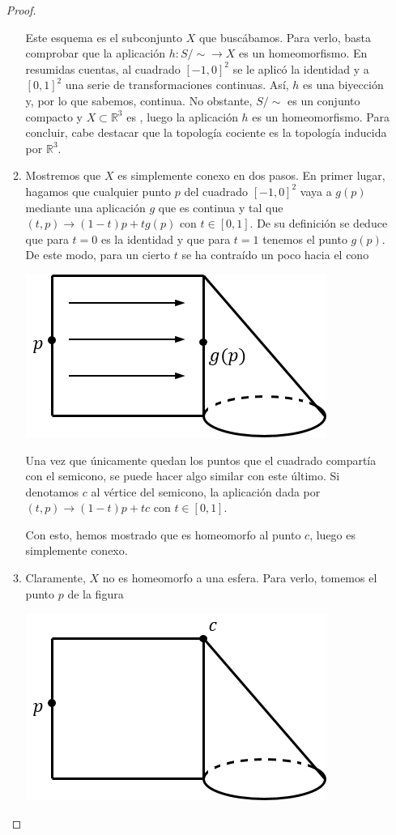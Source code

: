 \begin{itemize}
\begin{proof}
\begin{enumerate}
	Este esquema es el subconjunto $X$ que buscábamos. Para verlo, basta comprobar que la aplicación $h: S/\sim \to X$ es un homeomorfismo. En resumidas cuentas, al cuadrado $[-1,0]^2$ se le aplicó la identidad y a $[0,1]^2$ una serie de transformaciones continuas. Así, $h$ es una biyección y, por lo que sabemos, continua. No obstante, $S/\sim$ es un conjunto compacto y $X\subset \mathbb{R}^3$ es \hausdorff, luego la aplicación $h$ es un homeomorfismo. Para concluir, cabe destacar que la topología cociente es la topología inducida por $\mathbb{R}^3$.
	
	\item Mostremos que $X$ es simplemente conexo en dos pasos. En primer lugar, hagamos que cualquier punto $p$ del cuadrado $[-1,0]^2$ vaya a $g(p)$ mediante una aplicación $g$ que es continua y tal que $(t,p)\to (1-t)p+tg(p)$ con $t\in[0,1]$. De su definición se deduce que para $t=0$ es la identidad y que para $t=1$ tenemos el punto $g(p)$. De este modo, para un cierto $t$ se ha contraído un poco hacia el cono
	
		\begin{center}
			\includegraphics[scale=0.5]{img/ExamenSeptiembre2017/Ex2007imagen4.png} 
		\end{center}
		
	Una vez que únicamente quedan los puntos que el cuadrado compartía con el semicono, se puede hacer algo similar con este último. Si denotamos $c$ al vértice del semicono, la aplicación dada por $(t,p)\to (1-t)p+tc$ con $t\in[0,1]$. 

	Con esto, hemos mostrado que es homeomorfo al punto $c$, luego es simplemente conexo. 
	
	\item Claramente, $X$ no es homeomorfo a una esfera. Para verlo, tomemos el punto $p$ de la figura
		
		\begin{center}
			\includegraphics[scale=0.5]{img/ExamenSeptiembre2017/Ex2007imagen5.png} 
		\end{center}
		

\end{enumerate}
\end{proof}
\end{itemize}
